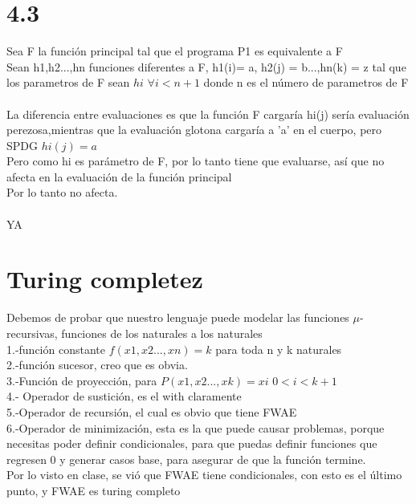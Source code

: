 \documentclass{article}
\begin{document}
\section{4.3}
Sea F la función principal tal que el programa P1 es equivalente a F\\
Sean h1,h2...,hn funciones diferentes a F, h1(i)= a, h2(j) = b...,hn(k) = z tal que los parametros de F sean $hi$  $ \forall i <n+1$ donde n es el número de parametros de F\\
\\La diferencia entre evaluaciones es que la función F
cargaría hi(j) sería evaluación perezosa,mientras que la evaluación glotona cargaría a 'a' en el cuerpo,
pero SPDG $hi(j) = a $\\
Pero como hi es parámetro de F, por lo tanto tiene que evaluarse, así que no afecta en la evaluación de la función principal\\
Por lo tanto no afecta.\\ \\
YA

\section{Turing completez}
Debemos de probar que nuestro lenguaje puede modelar las funciones $\mu$-recursivas, funciones de los naturales a los naturales\\
1.-función constante $f(x1,x2...,xn) = k$ para toda n y k naturales
\\2.-función sucesor, creo que es obvia.
\\3.-Función de proyección, para  $P(x1,x2...,xk)=xi$  $0<i<k+1$
\\4.- Operador de sustición, es el with claramente\\
5.-Operador de recursión, el cual es obvio que tiene FWAE
\\6.-Operador de minimización, esta es la que puede causar problemas, porque necesitas poder definir condicionales,
para que puedas definir funciones que regresen 0 y generar casos base, para asegurar de que la función termine.\\
Por lo visto en clase, se vió que FWAE tiene condicionales, con esto es el último punto, y FWAE es turing completo
\end{document}
